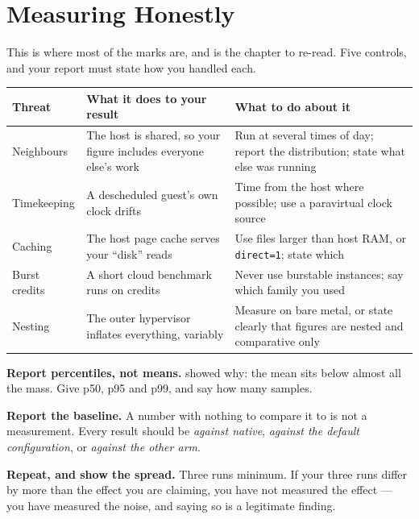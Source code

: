 \section{Measuring Honestly}

This is where most of the marks are, and  is the chapter to
re-read. Five controls, and your report must state how you handled each.

\begin{longtable}{@{}L{3.2cm}L{5.1cm}L{6.0cm}@{}}
\toprule
{}
\textbf{Threat} & \textbf{What it does to your result} &
\textbf{What to do about it} \\
\midrule
\endhead
Neighbours & The host is shared, so your figure includes everyone else's work &
Run at several times of day; report the distribution; state what else was
running \\
Timekeeping & A descheduled guest's own clock drifts & Time from the host where
possible; use a paravirtual clock source \\
Caching & The host page cache serves your ``disk'' reads & Use files larger than
host RAM, or \texttt{direct=1}; state which \\
Burst credits & A short cloud benchmark runs on credits & Never use burstable
instances; say which family you used \\
Nesting & The outer hypervisor inflates everything, variably & Measure on
bare metal, or state clearly that figures are nested and comparative only \\
\bottomrule
\end{longtable}

\begin{conceptbox}
\textbf{Report percentiles, not means.}  showed why: the
mean sits below almost all the mass. Give p50, p95 and p99, and say how many
samples.

\smallskip
\textbf{Report the baseline.} A number with nothing to compare it to is not a
measurement. Every result should be \emph{against native}, \emph{against the
default configuration}, or \emph{against the other arm}.

\smallskip
\textbf{Repeat, and show the spread.} Three runs minimum. If your three runs
differ by more than the effect you are claiming, you have not measured the
effect --- you have measured the noise, and saying so is a legitimate finding.
\end{conceptbox}

